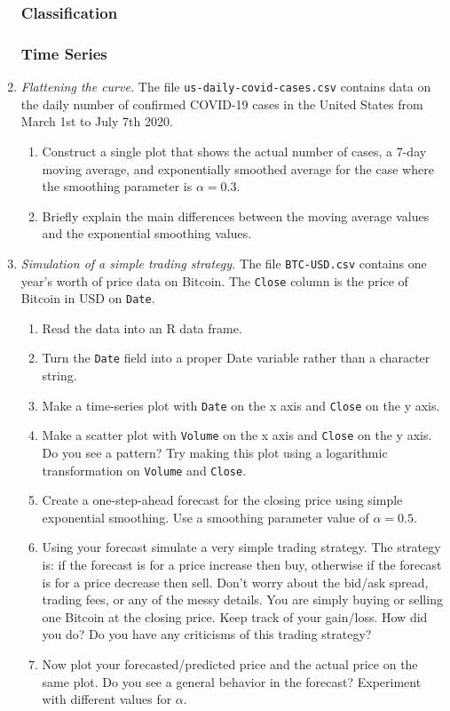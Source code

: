 \begin{enumerate}
\subsubsection*{Classification}

\subsubsection*{Time Series}

\item \emph{Flattening the curve.}  The file
  \texttt{us-daily-covid-cases.csv} contains data on the daily number
  of confirmed COVID-19 cases in the United States from March 1st to
  July 7th 2020.

\begin{enumerate}
\item Construct a single plot that shows the actual number of cases,
a 7-day moving average, and exponentially smoothed average for 
the case where the smoothing parameter is $\alpha=0.3$. 
\item Briefly explain the main differences between the moving average
values and the exponential smoothing values.
\end{enumerate}

\item \emph{Simulation of a simple trading strategy.}
  The file \texttt{BTC-USD.csv} contains one year's worth of price
  data on Bitcoin. The \texttt{Close} column is the price of
  Bitcoin in USD on \texttt{Date}. 

\begin{enumerate}
\item Read the data into an R data frame.
\item Turn the \texttt{Date} field into a proper Date variable rather
  than a character string.
\item Make a time-series plot with \texttt{Date} on the x axis and
  \texttt{Close} on the y axis.
\item Make a scatter plot with \texttt{Volume} on the x axis and
  \texttt{Close} on the y axis. Do you see a pattern? Try making
  this plot using a logarithmic transformation on \texttt{Volume} and
  \texttt{Close}.
\item Create a one-step-ahead forecast for the closing price using
  simple exponential smoothing. Use a smoothing parameter value
  of $\alpha = 0.5$.
\item Using your forecast simulate a very simple trading strategy.
  The strategy is: if the forecast is for a price increase then buy,
  otherwise if the forecast is for a price decrease then sell. Don't
  worry about the bid/ask spread, trading fees, or any of the messy
  details. You are simply buying or selling one Bitcoin at the closing
  price. Keep track of your gain/loss. How did you do? Do you
  have any criticisms of this trading strategy?
\item  Now plot your forecasted/predicted price and the actual price
  on the same plot. Do you see a general behavior in the forecast?
  Experiment with different values for $\alpha$.
\end{enumerate}
  
\end{enumerate}
